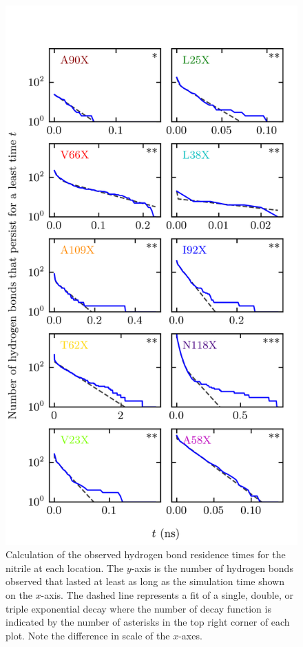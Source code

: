 \begin{figure}
    \center
    \includegraphics[width=\single]{figures-snase/Lifetimes.png}
    \caption[Obvserved hydrogen bond residence times]{
        Calculation of the observed hydrogen bond residence times for the nitrile at each location. 
        The $y$-axis is the number of hydrogen bonds observed that lasted at least as long as the simulation time shown on the $x$-axis. 
        The dashed line represents a fit of a single, double, or triple exponential decay where the number of decay function is indicated by the number of asterisks in the top right corner of each plot. 
        Note the difference in scale of the $x$-axes.
    }
    \label{fig:snase-lifetimes}
\end{figure}

